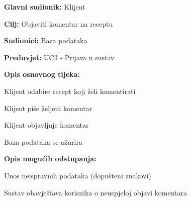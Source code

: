 					\noindent {}
					\begin{packed_item}
	
						\item \textbf{Glavni sudionik: } Klijent
						\item  \textbf{Cilj:} Objaviti komentar na receptu 
						\item  \textbf{Sudionici:} Baza podataka
						\item  \textbf{Preduvjet:} UC3 - Prijava u sustav
						\item  \textbf{Opis osnovnog tijeka:}
						
						\item[] \begin{packed_enum}
							
							\item Klijent odabire recept koji želi komentirati
							\item Klijent piše željeni komentar
							\item Klijent objavljuje komentar
							\item Baza podataka se ažurira
						\end{packed_enum}

						\item  \textbf{Opis mogućih odstupanja:}
						
						\item[] \begin{packed_item}
	
							\item[3.a] Unos neispravnih podataka (dopušteni znakovi)
							\item[] \begin{packed_enum}
								
								\item Sustav obavještava korisnika o neuspjeloj objavi komentara
								
							\end{packed_enum}
						\end{packed_item}
					\end{packed_item}

